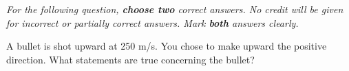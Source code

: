 \documentclass[10pt]{examdesign}
\begin{document}
\begin{multiplechoice} [title={Multiple Correct Multiple Choice},
	rearrange=no]
	\textit{For the following question, \textbf{choose two} correct answers.  No credit will be given for incorrect or partially correct answers.  Mark \textbf{both} answers clearly.} 



\begin{question}
	A bullet is shot upward at 250 m/s.  You chose to make upward the positive direction.  What statements are true concerning the bullet? 
\end{question}







\end{multiplechoice}
\end{document}
